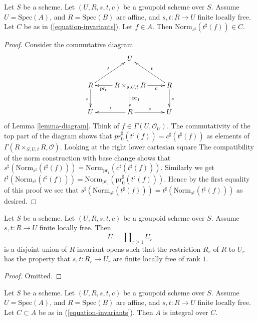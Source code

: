 \begin{lemma}
\label{lemma-determinant-trick}
Let $S$ be a scheme. Let $(U, R, s, t, c)$ be a groupoid scheme over $S$.
Assume $U = \text{Spec}(A)$, and $R = \text{Spec}(B)$ are affine, and
$s, t : R \to U$ finite locally free.
Let $C$ be as in (\ref{equation-invariants}).
Let $f \in A$. Then $\text{Norm}_{s^\sharp}(t^\sharp(f)) \in C$.
\end{lemma}

\begin{proof}
Consider the commutative diagram
$$
\xymatrix{
& U & \\
R \ar[d]_s \ar[ru]^t &
R \times_{s, U, t} R
\ar[l]^-{\text{pr}_0} \ar[d]^{\text{pr}_1} \ar[r]_-c &
R \ar[d]^s \ar[lu]_t \\
U & R \ar[l]_t \ar[r]^s & U
}
$$
of Lemma \ref{lemma-diagram}.
Think of $f \in \Gamma(U, \mathcal{O}_U)$. The commutativity of the
top part of the diagram shows that
$pr_0^\sharp(t^\sharp(f)) = c^\sharp(t^\sharp(f))$ as elements of
$\Gamma(R \times_{S, U, t} R, \mathcal{O})$.
Looking at the right lower cartesian square
The compatibility of the norm construction with base change shows that
$s^\sharp(\text{Norm}_{s^\sharp}(t^\sharp(f))) =
\text{Norm}_{\text{pr}_1}(c^\sharp(t^\sharp(f)))$.
Similarly we get
$t^\sharp(\text{Norm}_{s^\sharp}(t^\sharp(f))) =
\text{Norm}_{\text{pr}_1}(\text{pr}_0^\sharp(t^\sharp(f)))$.
Hence by the first equality of this proof we see that
$s^\sharp(\text{Norm}_{s^\sharp}(t^\sharp(f))) =
t^\sharp(\text{Norm}_{s^\sharp}(t^\sharp(f)))$ as desired.
\end{proof}

\begin{lemma}
\label{lemma-finite-locally-free-disjoint-free}
Let $S$ be a scheme. Let $(U, R, s, t, c)$ be a groupoid scheme over $S$.
Assume $s, t : R \to U$ finite locally free.
Then
$$
U = \coprod\nolimits_{r \geq 1} U_r
$$
is a disjoint union of $R$-invariant opens such that the restriction $R_r$ of
$R$ to $U_r$ has the property that $s,t : R_r \to U_r$ are finite locally
free of rank $1$.
\end{lemma}

\begin{proof}
Omitted.
\end{proof}

\begin{lemma}
\label{lemma-integral-over-invariants}
Let $S$ be a scheme. Let $(U, R, s, t, c)$ be a groupoid scheme over $S$.
Assume $U = \text{Spec}(A)$, and $R = \text{Spec}(B)$ are affine, and
$s, t : R \to U$ finite locally free.
Let $C \subset A$ be as in (\ref{equation-invariants}).
Then $A$ is integral over $C$.
\end{lemma}


